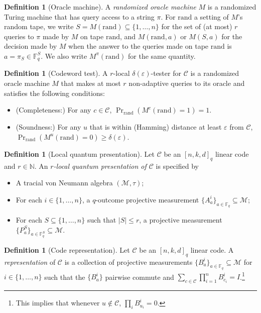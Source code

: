 \documentclass[11pt]{article}
\theoremstyle{definition}
\newtheorem{definition}[theorem]{Definition}
\newcommand{\code}{\mathcal{C}}
\newcommand{\Id}{\ensuremath{I}}
\newcommand{\N}{\ensuremath{\mathbb{N}}}
\newcommand{\F}{\ensuremath{\mathbb{F}}}
\newcommand{\mM}{\ensuremath{\mathcal{M}}}
\newcommand{\rand}{\textrm{rand}}
\newcommand{\eps}{\varepsilon}
\begin{document}
\begin{definition}[Oracle machine]
A \emph{randomized oracle machine} $M$ is a randomized Turing machine that has query access to a string $\pi$. For $\rand$ a setting of $M$'s random tape, we write $S=M(\rand)\subseteq\{1,\ldots,n\}$ for the set of (at most) $r$ queries to $\pi$ made by $M$ on tape $\rand$, and $M(\rand,a)$ or $M(S,a)$ for the decision made by $M$ when the answer to the queries made on tape $\rand$ is $a=\pi_S\in \F_q^S$. We also write $M^\pi(\rand)$ for the same quantity.  
\end{definition}

\begin{definition}[Codeword test]
A $r$-local $\delta(\eps)$-tester for $\code$ is a randomized oracle machine $M$ that makes at most $r$ non-adaptive queries to its oracle and satisfies the following conditions:
\begin{itemize} 
\item (Completeness:) For any $c\in \code$, $\Pr_\rand( M^c(\rand)=1)=1$.
\item (Soundness:) For any $u$ that is within (Hamming) distance at least  $\eps$ from $\code$, $\Pr_\rand(M^u(\rand)=0)\geq \delta(\eps)$. 
\end{itemize}
\end{definition}

\begin{definition}[Local quantum presentation]
Let $\code$ be an $[n,k,d]_q$ linear code and $r\in \N$. An \emph{$r$-local quantum presentation of $\code$} is specified by
\begin{itemize}
\item A tracial von Neumann algebra $(\mM,\tau)$;
\item For each $i\in\{1,\ldots,n\}$, a $q$-outcome projective measurement $\{A^i_a\}_{a\in \F_q} \subseteq \mM$;
\item For each $S\subseteq \{1,\ldots,n\}$ such that $|S|\leq r$, a projective measurement $\{P^S_a\}_{a\in \F_q^S}\subseteq \mM$.
\end{itemize}
\end{definition}

\begin{definition}[Code representation]
Let $\code$ be an $[n,k,d]_q$ linear code. A \emph{representation} of $\code$ is a collection of projective measurements $\{B^i_a\}_{a\in\F_q} \subseteq\mM$ for $i\in\{1,\ldots,n\}$ such that the $\{B^i_a\}$ pairwise commute and $\sum_{c\in\code} \prod_{i=1}^n B^i_{c_i}=\Id$.\footnote{This implies that whenever $u\notin \code$, $\prod_i B^i_{u_i}=0$.} 
\end{definition}
\end{document}
